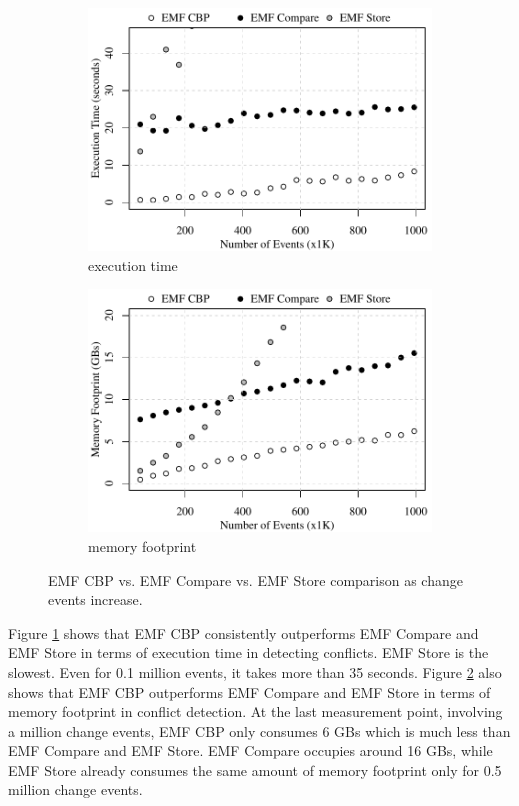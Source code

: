 \begin{figure}[ht]
\begin{subfigure}[t]{0.490\linewidth}
	\includegraphics[width=\linewidth]{conflict-time-events}
	\caption{execution time}
	\label{fig:conflict-time-events}
\end{subfigure}
\hfill
\begin{subfigure}[t]{0.490\linewidth}
	\includegraphics[width=\linewidth]{conflict-memory-events}
	\caption{memory footprint}
	\label{fig:conflict-memory-events}
\end{subfigure}
\caption{EMF CBP vs. EMF Compare vs. EMF Store comparison as change events increase.}
\label{fig:conflict_events}
\end{figure}

Figure \ref{fig:conflict-time-events} shows that EMF CBP consistently outperforms EMF Compare and EMF Store in terms of execution time in detecting conflicts. EMF Store is the slowest. Even for 0.1 million events, it takes more than 35 seconds. Figure \ref{fig:conflict-memory-events} also shows that EMF CBP outperforms EMF Compare and EMF Store in terms of memory footprint in conflict detection. At the last measurement point, involving a million change events, EMF CBP only consumes 6 GBs which is much less than EMF Compare and EMF Store. EMF Compare occupies around 16 GBs, while EMF Store already consumes the same amount of memory footprint only for 0.5 million change events.

